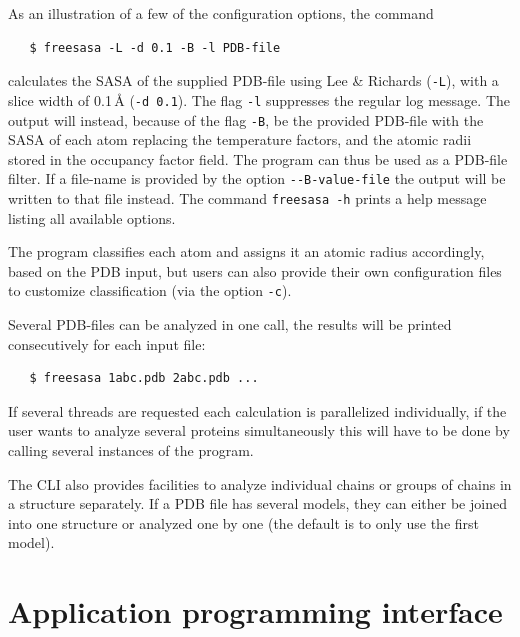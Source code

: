 \documentclass[a4paper,11pt]{article}
\begin{document}
As an illustration of a few of the configuration options, the command
\begin{verbatim}
   $ freesasa -L -d 0.1 -B -l PDB-file
\end{verbatim}
calculates the SASA of the supplied PDB-file using Lee \& Richards
(\verb|-L|), with a slice width of 0.1\,Å (\verb|-d 0.1|). The flag
\verb|-l| suppresses the regular log message. The output will instead,
because of the flag \verb|-B|, be the provided PDB-file with the SASA
of each atom replacing the temperature factors, and the atomic radii
stored in the occupancy factor field. The program can thus be used as
a PDB-file filter. If a file-name is provided by the option
\verb|--B-value-file| the output will be written to that file
instead. The command \verb|freesasa -h| prints a help message listing
all available options.

The program classifies each atom and assigns it an atomic radius
accordingly, based on the PDB input, but users can also provide their
own configuration files to customize classification (via the option
\verb|-c|).

Several PDB-files can be analyzed in one call, the results will be
printed consecutively for each input file:
\begin{verbatim}
   $ freesasa 1abc.pdb 2abc.pdb ...
\end{verbatim}
If several threads are requested each calculation is parallelized
individually, if the user wants to analyze several proteins
simultaneously this will have to be done by calling several instances
of the program.

The CLI also provides facilities to analyze individual chains or
groups of chains in a structure separately. If a PDB file has several
models, they can either be joined into one structure or analyzed one
by one (the default is to only use the first model).

\section{Application programming interface}\label{sec:api}
\end{document}
